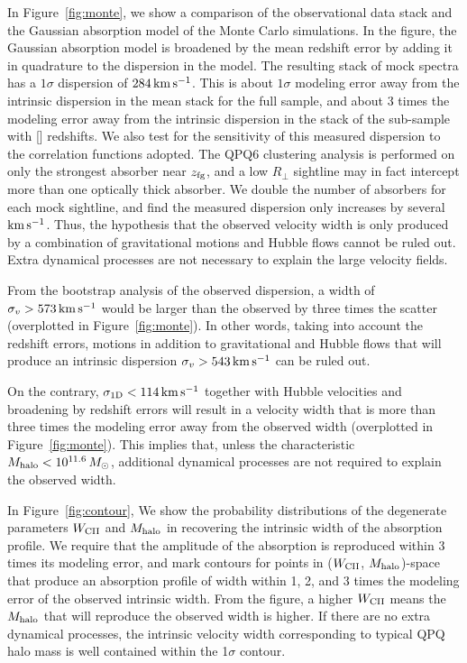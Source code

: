 \documentclass[iop]{emulateapj}
\begin{document}
In Figure~\ref{fig:monte}, we show a comparison of the observational data stack and the Gaussian 
absorption model of the Monte Carlo simulations. In the figure, the Gaussian absorption model is 
broadened by the mean redshift error by adding it in quadrature to the dispersion in the model. 
The resulting stack of mock spectra has a $1\sigma$ dispersion of $284\,{\rm km\,s^{-1}}$. This is 
about $1\sigma$ modeling error away from the intrinsic dispersion in the  mean stack for 
the full sample, and about 3 times the modeling error away from the intrinsic dispersion in the 
stack of the sub-sample with [] redshifts. We also test for the 
sensitivity of this measured dispersion to the correlation functions adopted. The QPQ6 clustering 
analysis is performed on only the strongest absorber near $z_{\rm fg}$, and a low $R_\perp$ 
sightline may in fact intercept more than one optically thick absorber. We double the number of 
absorbers for each mock sightline, and find the measured dispersion only increases by several 
${\rm km\,s^{-1}}$. Thus, the hypothesis that the observed velocity width is only produced by a 
combination of gravitational motions and Hubble flows cannot be ruled out. Extra dynamical 
processes are not necessary to explain the large velocity fields. 

From the bootstrap 
analysis of the observed dispersion, a width of $\sigma_v>573\,{\rm km\,s^{-1}}$ would be larger 
than the observed by three times the scatter (overplotted in Figure~\ref{fig:monte}). In other 
words, taking into account the redshift errors, motions in addition to gravitational and Hubble 
flows that will produce an intrinsic dispersion $\sigma_v>543\,{\rm km\,s^{-1}}$ can be ruled out. 

On the contrary, 
$\sigma_{\rm 1D}<114\,{\rm km\,s^{-1}}$ together with Hubble velocities and 
broadening by redshift errors will result in a velocity width that is more than three times the 
modeling error away from the observed width (overplotted in Figure~\ref{fig:monte}). This implies 
that, unless the characteristic $M_{\rm halo}<10^{11.6}\,M_\odot$, 
additional dynamical processes are not required to explain the observed width.  

In Figure~\ref{fig:contour}, We show the probability distributions of the degenerate parameters 
$W_{\rm CII}$ and $M_{\rm halo}$ in recovering the intrinsic width of the absorption profile. We 
require that the amplitude of the absorption is reproduced within 3 times its modeling error, and 
mark contours for points in ($W_{\rm CII}$, $M_{\rm halo}$)-space that produce an absorption 
profile of width within 1, 2, and 3 times the modeling error of the observed intrinsic width. 
From the figure, a higher $W_{\rm CII}$ means the $M_{\rm halo}$ that will reproduce the observed 
width is higher. If there are no extra dynamical processes, the intrinsic velocity width 
corresponding to typical QPQ halo mass is well contained within the 1$\sigma$ contour. 
\end{document}
